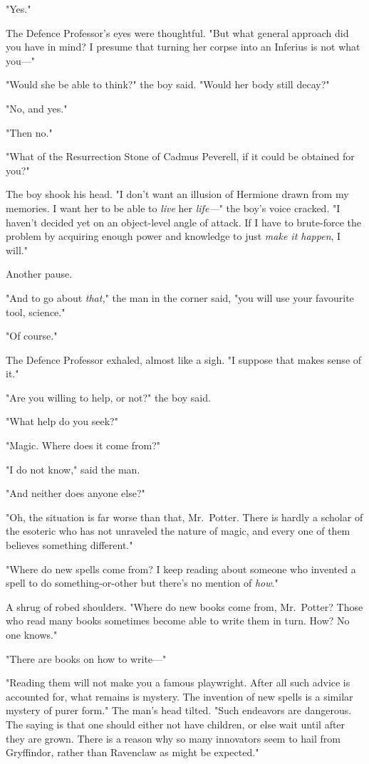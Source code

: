 "Yes."

The Defence Professor's eyes were thoughtful. "But what general approach did
you have in mind? I presume that turning her corpse into an Inferius is not
what you---"

"Would she be able to think?" the boy said. "Would her body still decay?"

"No, and yes."

"Then no."

"What of the Resurrection Stone of Cadmus Peverell, if it could be obtained for
you?"

The boy shook his head. "I don't want an illusion of Hermione drawn from my
memories. I want her to be able to \emph{live} her \emph{life---}" the boy's
voice cracked. "I haven't decided yet on an object-level angle of attack. If I
have to brute-force the problem by acquiring enough power and knowledge to just
\emph{make it happen}, I will."

Another pause.

"And to go about \emph{that,}" the man in the corner said, "you will use your
favourite tool, science."

"Of course."

The Defence Professor exhaled, almost like a sigh. "I suppose that makes sense
of it."

"Are you willing to help, or not?" the boy said.

"What help do you seek?"

"Magic. Where does it come from?"

"I do not know," said the man.

"And neither does anyone else?"

"Oh, the situation is far worse than that, Mr.~Potter. There is hardly a
scholar of the esoteric who has not unraveled the nature of magic, and every
one of them believes something different."

"Where do new spells come from? I keep reading about someone who invented a
spell to do something-or-other but there's no mention of \emph{how}."

A shrug of robed shoulders. "Where do new books come from, Mr.~Potter? Those
who read many books sometimes become able to write them in turn. How? No one
knows."

"There are books on how to write---"

"Reading them will not make you a famous playwright. After all such advice is
accounted for, what remains is mystery. The invention of new spells is a
similar mystery of purer form." The man's head tilted. "Such endeavors are
dangerous. The saying is that one should either not have children, or else wait
until after they are grown. There is a reason why so many innovators seem to
hail from Gryffindor, rather than Ravenclaw as might be expected."

